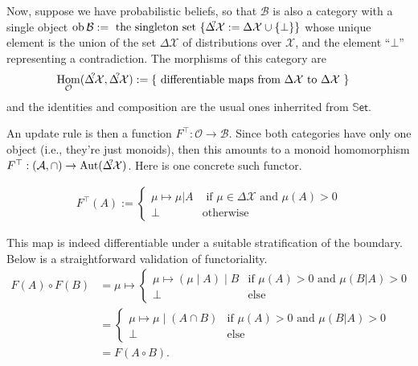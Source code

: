 \documentclass{article}
\DeclareMathOperator{\ob}{\mathrm{ob}}
\DeclareMathOperator{\id}{id}
\DeclareMathOperator{\Hom}{\mathrm{Hom}}
\newcommand\X{\mathcal{X}}
\newcommand\A{\mathcal{A}}
\newcommand\B{\mathcal{B}}
\newcommand\Ob{\mathcal{O}}
\newcommand\Set{\mathbb{S}\mathsf{et}}
\theoremstyle{plain}
\theoremstyle{definition}
\begin{document}
    \def\DX?{\Delta^{\mathclap{\!\!?\!}}\X}
    
    Now, suppose we have probabilistic beliefs, so that $\B$ is also a category with a single object
    $\ob \B := \text{ the singleton set } \{ \DX? := \Delta\X \cup \{ \bot \} \}$
    whose unique element is the union of the set $\Delta\X$ of distributions over $\X$, and the element ``$\bot$'' representing a contradiction. The morphisms of this category are 
    \begin{align*}
        \Hom_{\Ob}(\DX?, \DX?) &:= 
            \{ \text{ differentiable maps from $\Delta\X$ to $\Delta\X$ } \} 
    \end{align*}
    and the identities and composition are the usual ones inherrited from $\Set$. 
    
    
    An update rule is then a function
    $F^\top : \Ob \to \B$. Since both categories have only one object (i.e., they're just monoids), then this amounts to a monoid homomorphism $F^\top : (\mathcal A, \cap) \to \mathrm{Aut}(\DX?)$.     
    Here is one concrete such functor.
    
    \begin{align*}
        F^\top(A
        ) := 
            \begin{cases}
                \mu \mapsto  \mu | A & \text{ if } \mu  \in \Delta\X \text{ and }\mu(A) > 0 \\
                \bot &\text{otherwise}                
        \end{cases}
    \end{align*}
    
    This map is indeed differentiable under a suitable stratification of the boundary. 
    Below is a straightforward validation of functoriality. 
    \begin{align*}
        F(A) \circ F(B) 
            &=  \mu \mapsto 
                \begin{cases}
                    \mu \mapsto (\mu \mid A) \mid B & \text{if $\mu(A) > 0$ and $\mu(B|A) > 0$} \\
                    \bot &\text{else}
                \end{cases} \\
            &= \begin{cases}
                    \mu \mapsto \mu \mid (A \cap B) & \text{if $\mu(A) > 0$ and $\mu(B|A) > 0$} \\
                    \bot &\text{else}
                \end{cases} \\
            &= F(A \circ B).
    \end{align*}
    
\end{document}
